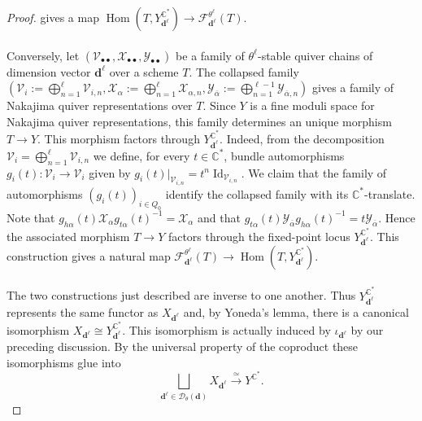 \documentclass{amsart}
\theoremstyle{plain}
\numberwithin{equation}{section}
\theoremstyle{definition}
\theoremstyle{remark}
\begin{document}
\begin{proof}
		gives a map
		$\operatorname{Hom}(T,Y^{\mathbb{C}^*}_{\mathbf{d}^\ell})
		\rightarrow
		\mathcal F^{\theta^\ell}_{\mathbf d^\ell}(T)
		$.
		\\
		\\
		Conversely, let $(\mathcal{V}_{\bullet\bullet},\mathcal{X}_{\bullet\bullet},\mathcal{Y}_{\bullet\bullet})$ be a family of $\theta^\ell$-stable quiver chains of dimension vector $\mathbf d^\ell$ over a scheme $T$. The collapsed family $(\mathcal{V}_i:=\bigoplus_{n=1}^{\ell}\mathcal{V}_{i,n},\mathcal{X}_\alpha:=\bigoplus_{n=1}^{\ell}\mathcal{X}_{\alpha,n},\mathcal{Y}_{\overline{\alpha}}:=\bigoplus_{n=1}^{\ell-1}\mathcal{Y}_{\overline{\alpha},n})$ gives a family of Nakajima quiver representations over $T$. Since $Y$ is a fine moduli space for Nakajima quiver representations, this family determines an unique morphism $T\rightarrow Y$. This morphism factors through $Y^{\mathbb{C}^*}_{\mathbf{d}^\ell}$. Indeed, from the decomposition
		$\mathcal{V}_i=\bigoplus_{n=1}^{\ell}\mathcal{V}_{i,n}$ we define, for every $t\in\mathbb C^*$, bundle automorphisms
		$g_i(t):\mathcal{V}_i\rightarrow \mathcal{V}_i$ given by
		$g_i(t)|_{\mathcal{V}_{i,n}}=t^n\operatorname{Id}_{\mathcal{V}_{i,n}}$. We claim that the family of automorphisms $(g_i(t))_{i\in Q_0}$ identify the collapsed family with its $\mathbb C^*$-translate. Note that $g_{h\alpha}(t)\mathcal{X}_\alpha g_{t\alpha}(t)^{-1}=\mathcal{X}_\alpha$ and that
		$g_{t\alpha}(t)\mathcal{Y}_{\overline\alpha}g_{h\alpha}(t)^{-1}=	t\mathcal{Y}_{\overline\alpha}$. Hence the associated morphism \(T\to Y\) factors through the fixed-point locus $Y^{\mathbb C^*}_{\mathbf{d}^\ell}$. This construction gives a natural map $\mathcal F^{\theta^\ell}_{\mathbf d^\ell}(T)\rightarrow \operatorname{Hom}(T,Y^{\mathbb{C}^*}_{\mathbf{d}^\ell})$.
		\\
		\\
		The two constructions just described are inverse to one another. Thus $Y^{\mathbb{C}^*}_{\mathbf{d}^\ell}$ represents the same functor as $X_{\mathbf d^\ell}$ and, by Yoneda's
		lemma, there is a canonical isomorphism $X_{\mathbf d^\ell}\cong Y^{\mathbb C^*}_{\mathbf d^\ell}$. This isomorphism is actually induced by $\iota_{\mathbf d^\ell}$ by our preceding discussion. By the universal property of the coproduct \cite[Section 7.3.8]{VakilAG} these isomorphisms glue into 
		$$
		\bigsqcup_{\mathbf{d}^\ell\in \mathscr{D}_{\theta}(\mathbf{d})}X_{\mathbf{d}^\ell}\overset{\simeq}{\longrightarrow} Y^{\mathbb{C}^*}.
		$$
	\end{proof}
	
\end{document}
